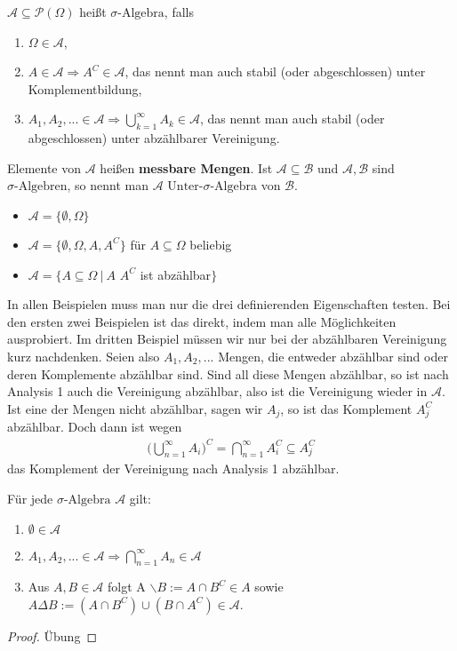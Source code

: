 \begin{deff} 
	$\mathcal{A} \subseteq \mathcal{P}(\Omega)$ heißt $\sigma\text{-Algebra}$, falls
	\begin{enumerate}[label=(\roman*)]
		\item $\Omega \in \mathcal{A}$,
		\item $A \in \mathcal{A} \Rightarrow A^C \in \mathcal{A}$, das nennt man auch stabil (oder abgeschlossen) unter Komplementbildung,
		\item $A_{1},A_{2},... \in \mathcal{A} \Rightarrow \bigcup\limits_{k=1}^{\infty}A_k \in \mathcal{A}$, das nennt man auch stabil (oder abgeschlossen) unter abzählbarer Vereinigung.
	\end{enumerate}
	Elemente von $\mathcal{A}$ heißen \textbf{messbare Mengen}. Ist $\mathcal{A} \subseteq \mathcal{B}$ und $\mathcal{A}, \mathcal{B}$ sind $\sigma\text{-Algebren}$, so nennt man $\mathcal{A}$ $\text{Unter-}\sigma\text{-Algebra}$ von $\mathcal{B}$.
\end{deff}

\begin{example}\label{E1} \abs
\begin{itemize}
	\item $\mathcal{A} = \{ \emptyset, \Omega \}$
	\item $\mathcal{A} = \{ \emptyset, \Omega, A, A^C \}$ für $A \subseteq \Omega$ beliebig
	\item $\mathcal{A} = \{ A \subseteq \Omega \: | \: A$  $A^C $ ist abzählbar$\}$
\end{itemize}
In allen Beispielen muss man nur die drei definierenden Eigenschaften testen. Bei den ersten zwei Beispielen ist das direkt, indem man alle M\"oglichkeiten ausprobiert. Im dritten Beispiel m\"ussen wir nur bei der abz\"ahlbaren Vereinigung kurz nachdenken. Seien also $A_1, A_2, ...$ Mengen, die entweder abz\"ahlbar sind oder deren Komplemente abz\"ahlbar sind. Sind all diese Mengen abz\"ahlbar, so ist nach Analysis 1 auch die Vereinigung abz\"ahlbar, also ist die Vereinigung wieder in $\mathcal A$. Ist eine der Mengen nicht abz\"ahlbar, sagen wir $A_j$, so ist das Komplement $A_j^C$ abz\"ahlbar. Doch dann ist wegen
\begin{align*}
	\Big(\bigcup_{n=1}^\infty A_i\Big)^C=\bigcap_{n=1}^\infty A_i^C \subseteq A_j^C
\end{align*}
das Komplement der Vereinigung nach Analysis 1 abz\"ahlbar. 
\end{example}
\begin{lemma}
Für jede $\sigma\text{-Algebra}$ $\mathcal{A}$ gilt:
\begin{enumerate}[label=(\roman*)]
	\item $\emptyset \in \mathcal{A}$
	\item $A_{1}, A_{2},... \in \mathcal{A} \Rightarrow \bigcap\limits_{n=1}^{\infty} A_{n} \in \mathcal{A}$
	\item Aus $A, B \in \mathcal{A}$ folgt A $\backslash B := A \cap B^C \in A$ sowie $A \Delta B := (A\cap B^C) \cup (B \cap A^C) \in  \mathcal A$.
\end{enumerate}
\begin{proof}
	Übung
\end{proof}
\end{lemma}

